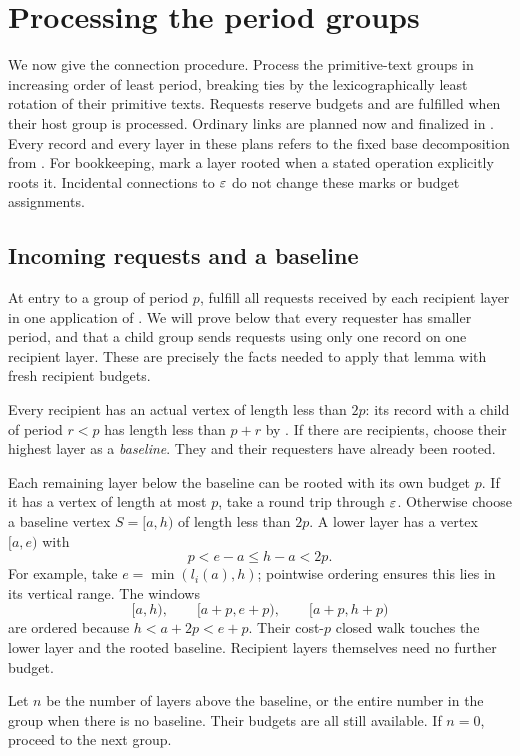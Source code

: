 \section{Processing the period groups}\label{sec:processing}

We now give the connection procedure. Process the primitive-text groups in increasing order of least period, breaking ties by the lexicographically least rotation of their primitive texts. Requests reserve budgets and are fulfilled when their host group is processed. Ordinary links are planned now and finalized in . Every record and every layer in these plans refers to the fixed base decomposition from . For bookkeeping, mark a layer rooted when a stated operation explicitly roots it. Incidental connections to $\varepsilon$ do not change these marks or budget assignments.

\subsection{Incoming requests and a baseline}

At entry to a group of period $p$, fulfill all requests received by each recipient layer in one application of . We will prove below that every requester has smaller period, and that a child group sends requests using only one record on one recipient layer. These are precisely the facts needed to apply that lemma with fresh recipient budgets.

Every recipient has an actual vertex of length less than $2p$: its record with a child of period $r<p$ has length less than $p+r$ by . If there are recipients, choose their highest layer as a \emph{baseline}. They and their requesters have already been rooted.

Each remaining layer below the baseline can be rooted with its own budget $p$. If it has a vertex of length at most $p$, take a round trip through $\varepsilon$. Otherwise choose a baseline vertex $S=[a,h)$ of length less than $2p$. A lower layer has a vertex $[a,e)$ with
\[
p<e-a\le h-a<2p.
\]
For example, take $e=\min(l_i(a),h)$; pointwise ordering ensures this lies in its vertical range. The windows
\[
[a,h),\qquad[a+p,e+p),\qquad[a+p,h+p)
\]
are ordered because $h<a+2p<e+p$. Their cost-$p$ closed walk touches the lower layer and the rooted baseline. Recipient layers themselves need no further budget.

Let $n$ be the number of layers above the baseline, or the entire number in the group when there is no baseline. Their budgets are all still available. If $n=0$, proceed to the next group.

